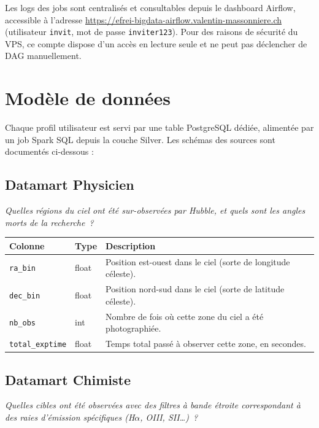 \documentclass[11pt,a4paper]{article}
\begin{document}
Les logs des jobs sont centralisés et consultables depuis le dashboard Airflow, accessible à l'adresse \href{https://efrei-bigdata-airflow.valentin-massonniere.ch}{https://efrei-bigdata-airflow.valentin-massonniere.ch} (utilisateur \texttt{invit}, mot de passe \texttt{inviter123}). Pour des raisons de sécurité du VPS, ce compte dispose d'un accès en lecture seule et ne peut pas déclencher de DAG manuellement.

\newpage
\section{Modèle de données}

Chaque profil utilisateur est servi par une table PostgreSQL dédiée, alimentée par un job Spark SQL depuis la couche Silver. Les schémas des sources sont documentés ci-dessous :

\subsection{Datamart Physicien}

{\small\textit{Quelles régions du ciel ont été sur-observées par Hubble, et quels sont les angles morts de la recherche~?}}

\begin{tabularx}{\linewidth}{llX}
\toprule
\textbf{Colonne} & \textbf{Type} & \textbf{Description} \\
\midrule
\texttt{ra\_bin}        & float & Position est-ouest dans le ciel (sorte de longitude céleste). \\
\texttt{dec\_bin}       & float & Position nord-sud dans le ciel (sorte de latitude céleste). \\
\texttt{nb\_obs}        & int   & Nombre de fois où cette zone du ciel a été photographiée. \\
\texttt{total\_exptime} & float & Temps total passé à observer cette zone, en secondes. \\
\bottomrule
\end{tabularx}

\subsection{Datamart Chimiste}

{\small\textit{Quelles cibles ont été observées avec des filtres à bande étroite correspondant à des raies d'émission spécifiques (H$\alpha$, OIII, SII\dots)~?}}
\end{document}
